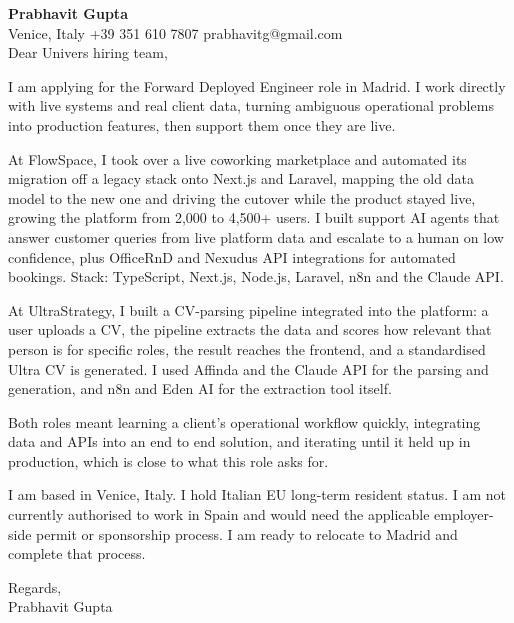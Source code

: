 \documentclass[a4paper,10.5pt]{article}
\begin{document}
\textbf{Prabhavit Gupta}\\
Venice, Italy \textbar{} +39 351 610 7807 \textbar{} prabhavitg@gmail.com\\[10pt]
Dear Univers hiring team,

I am applying for the Forward Deployed Engineer role in Madrid. I work directly with live systems and real client data, turning ambiguous operational problems into production features, then support them once they are live.

At FlowSpace, I took over a live coworking marketplace and automated its migration off a legacy stack onto Next.js and Laravel, mapping the old data model to the new one and driving the cutover while the product stayed live, growing the platform from 2,000 to 4,500+ users. I built support AI agents that answer customer queries from live platform data and escalate to a human on low confidence, plus OfficeRnD and Nexudus API integrations for automated bookings. Stack: TypeScript, Next.js, Node.js, Laravel, n8n and the Claude API.

At UltraStrategy, I built a CV-parsing pipeline integrated into the platform: a user uploads a CV, the pipeline extracts the data and scores how relevant that person is for specific roles, the result reaches the frontend, and a standardised Ultra CV is generated. I used Affinda and the Claude API for the parsing and generation, and n8n and Eden AI for the extraction tool itself.

Both roles meant learning a client's operational workflow quickly, integrating data and APIs into an end to end solution, and iterating until it held up in production, which is close to what this role asks for.

I am based in Venice, Italy. I hold Italian EU long-term resident status. I am not currently authorised to work in Spain and would need the applicable employer-side permit or sponsorship process. I am ready to relocate to Madrid and complete that process.

Regards,\\
Prabhavit Gupta
\end{document}
